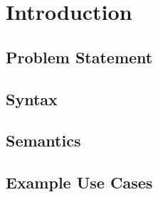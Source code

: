\chapter{Introduction}\label{ch:introduction}

\section{Problem Statement}

\section{Syntax}

\section{Semantics}

\section{Example Use Cases}
